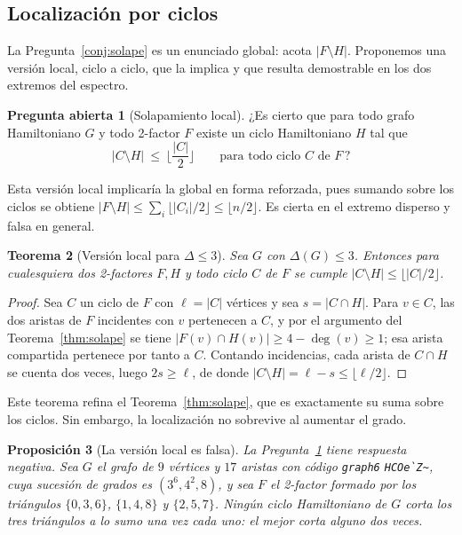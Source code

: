 \documentclass[11pt,a4paper]{article}
\newtheorem{teorema}{Teorema}[section]
\newtheorem{proposicion}[teorema]{Proposición}
\theoremstyle{definition}
\newtheorem{pregunta}[teorema]{Pregunta abierta}
\theoremstyle{remark}
\begin{document}
\subsection{Localización por ciclos}\label{sub:local}

La Pregunta~\ref{conj:solape} es un enunciado global: acota $|F\setminus H|$. Proponemos una versión local, ciclo a ciclo, que la implica y que resulta demostrable en los dos extremos del espectro.

\begin{pregunta}[Solapamiento local]\label{conj:local}
¿Es cierto que para todo grafo Hamiltoniano $G$ y todo 2-factor $F$ existe un ciclo Hamiltoniano $H$ tal que
\[
|C\setminus H|\ \le\ \Big\lfloor \frac{|C|}{2}\Big\rfloor
\qquad\text{para todo ciclo } C \text{ de } F\,?
\]
\end{pregunta}

Esta versión local implicaría la global en forma reforzada, pues sumando sobre los ciclos se obtiene $|F\setminus H|\le\sum_i\lfloor|C_i|/2\rfloor\le\lfloor n/2\rfloor$. Es cierta en el extremo disperso y falsa en general.

\begin{teorema}[Versión local para $\Delta\le3$]\label{thm:localsub}
Sea $G$ con $\Delta(G)\le3$. Entonces para \emph{cualesquiera} dos 2-factores $F,H$ y todo ciclo $C$ de $F$ se cumple $|C\setminus H|\le\lfloor|C|/2\rfloor$.
\end{teorema}

\begin{proof}
Sea $C$ un ciclo de $F$ con $\ell=|C|$ vértices y sea $s=|C\cap H|$. Para $v\in C$, las dos aristas de $F$ incidentes con $v$ pertenecen a $C$, y por el argumento del Teorema~\ref{thm:solape} se tiene $|F(v)\cap H(v)|\ge4-\deg(v)\ge1$; esa arista compartida pertenece por tanto a $C$. Contando incidencias, cada arista de $C\cap H$ se cuenta dos veces, luego $2s\ge\ell$, de donde $|C\setminus H|=\ell-s\le\lfloor\ell/2\rfloor$.
\end{proof}

Este teorema refina el Teorema~\ref{thm:solape}, que es exactamente su suma sobre los ciclos. Sin embargo, la localización no sobrevive al aumentar el grado.

\begin{proposicion}[La versión local es falsa]\label{prop:localfalsa}
La Pregunta~\ref{conj:local} tiene respuesta negativa. Sea $G$ el grafo de $9$ vértices y $17$ aristas con código \texttt{graph6} \verb|HCOe`Z~|, cuya sucesión de grados es $(3^6,4^2,8)$, y sea $F$ el 2-factor formado por los triángulos $\{0,3,6\}$, $\{1,4,8\}$ y $\{2,5,7\}$. Ningún ciclo Hamiltoniano de $G$ corta los tres triángulos a lo sumo una vez cada uno: el mejor corta alguno dos veces.
\end{proposicion}
\end{document}
